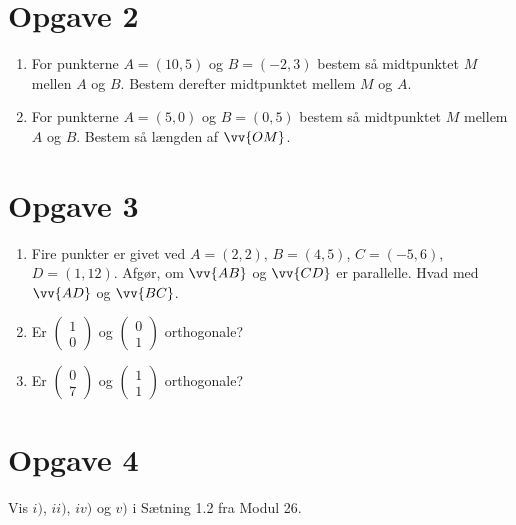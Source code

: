 \section*{Opgave 2}
\begin{enumerate}[label=\roman*)]
\item For punkterne $A = (10,5)$ og $B= (-2,3)$ bestem så midtpunktet $M$ mellen $A$ og $B$. Bestem derefter midtpunktet mellem $M$ og $A$.
\item For punkterne $A = (5,0)$ og $B = (0,5)$ bestem så midtpunktet $M$ mellem $A$ og $B$. Bestem så længden af $\vv{OM}$.
\end{enumerate}

\section*{Opgave 3}
\begin{enumerate}[label=\roman*)]
\item Fire punkter er givet ved $A = (2,2)$, $B = (4,5)$, $C = (-5,6)$, $D = (1,12)$. Afgør, om $\vv{AB}$ og $\vv{CD}$ er parallelle. Hvad med $\vv{AD}$ og $\vv{BC}$.
\item Er $\begin{pmatrix}1\\0\end{pmatrix}$ og $\begin{pmatrix}
0\\1
\end{pmatrix}$ orthogonale? 
\item Er $\begin{pmatrix}0\\7\end{pmatrix}$ og $\begin{pmatrix}
1\\1
\end{pmatrix}$ orthogonale? 
\end{enumerate}

\section*{Opgave 4}

Vis $i)$, $ii)$, $iv)$ og $v)$ i Sætning 1.2 fra Modul 26.